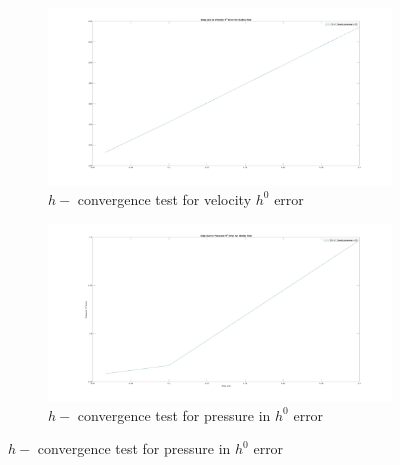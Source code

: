 \documentclass[a4paper]{book}
\begin{document}
\begin{figure}
\begin{subfigure}{\textwidth}	
  \includegraphics[width=\linewidth]{h0_velocity_stokes.jpg}
  \caption{$h-$ convergence test for velocity $h^0$ error}
  \label{fig:vel_stoke_conv_h0}
\end{subfigure}
\begin{subfigure}{\textwidth}	
  \includegraphics[width=\linewidth]{h0_pressure_stokes.jpg}
  \caption{$h-$ convergence test for pressure in $h^0$ error}
  \label{fig:pre_stoke_conv_h0}
\end{subfigure}
\end{figure}
\end{document}
